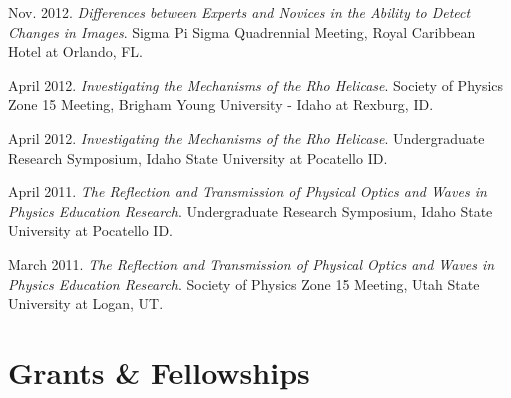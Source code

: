 \documentclass[11pt, letterpaper, roman]{moderncv} %
\begin{document}
\begin{etaremune}[topsep=0pt, itemsep=6pt, partopsep=0pt, parsep=0pt]
  \item Nov. 2012. \textit{Differences between Experts and Novices in the Ability to Detect Changes in Images}. Sigma Pi Sigma Quadrennial Meeting, Royal Caribbean Hotel at Orlando, FL.

  \item April 2012. \textit{Investigating the Mechanisms of the Rho Helicase}. Society of Physics Zone 15 Meeting, Brigham Young University - Idaho at Rexburg, ID.

  \item April 2012. \textit{Investigating the Mechanisms of the Rho Helicase}. Undergraduate Research Symposium, Idaho State University at Pocatello ID.

  \item April 2011. \textit{The Reflection and Transmission of Physical Optics and Waves in Physics Education Research}. Undergraduate Research Symposium, Idaho State University at Pocatello ID.

  \item March 2011. \textit{The Reflection and Transmission of Physical Optics and Waves in Physics Education Research}. Society of Physics Zone 15 Meeting, Utah State University at Logan, UT.
\end{etaremune}

\newpage

\section{Grants \& Fellowships}
    \vspace{4pt}
    
    \vspace{4pt}
    
\end{document}
